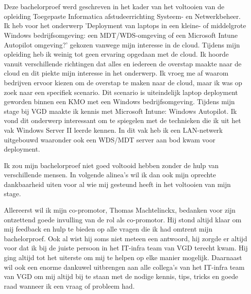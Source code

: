 
\chapter*{}
\label{ch:voorwoord}


Deze bachelorproef werd geschreven in het kader van het voltooien van de opleiding Toegepaste Informatica afstudeerrichting Systeem- en Netwerkbeheer. Ik heb voor het onderwerp 'Deployment van laptops in een kleine- of middelgrote Windows bedrijfsomgeving: een MDT/WDS-omgeving of een Microsoft Intune Autopilot omgeving?' gekozen vanwege mijn interesse in de cloud. Tijdens mijn opleiding heb ik weinig tot geen ervaring opgedaan met de cloud. Ik hoorde vanuit verschillende richtingen dat alles en iedereen de overstap maakte naar de cloud en dit piekte mijn interesse in het onderwerp. Ik vroeg me af waarom bedrijven ervoor kiezen om de overstap te maken naar de cloud, maar ik was op zoek naar een specifiek scenario. Dit scenario is uiteindelijk laptop deployment geworden binnen een KMO met een Windows bedrijfsomgeving. Tijdens mijn stage bij VGD maakte ik kennis met Microsoft Intune: Windows Autopilot. Ik vond dit onderwerp interessant om te spiegelen met de technieken die ik uit het vak Windows Server II leerde kennen. In dit vak heb ik een LAN-netwerk uitgebouwd waaronder ook een WDS/MDT server aan bod kwam voor deployment.

Ik zou mijn bachelorproef niet goed voltooid hebben zonder de hulp van verschillende mensen. In volgende alinea’s wil ik dan ook mijn oprechte dankbaarheid uiten voor al wie mij gesteund heeft in het voltooien van mijn stage.

Allereerst wil ik mijn co-promotor, Thomas Machtelinckx, bedanken voor zijn ontzettend goede invulling van de rol als co-promotor. Hij stond altijd klaar om mij feedback en hulp te bieden op alle vragen die ik had omtrent mijn bachelorproef. Ook al wist hij soms niet meteen een antwoord, hij zorgde er altijd voor dat ik bij de juiste persoon in het IT-infra team van VGD terecht kwam. Hij ging altijd tot het uiterste om mij te helpen op elke manier mogelijk. Daarnaast wil ook een enorme dankuwel uitbrengen aan alle collega's van het IT-infra team van VGD om mij altijd bij te staan met de nodige kennis, tips, tricks en goede raad wanneer ik een vraag of probleem had.

